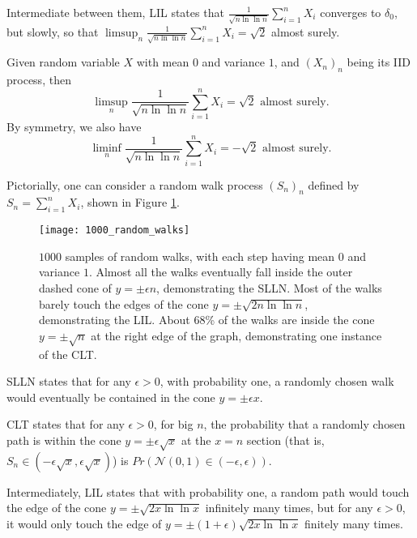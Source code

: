 Intermediate between them, LIL states that $\frac{1}{\sqrt{n\ln\ln{n}}} \sum_{i = 1}^n X_i$ converges to $\delta_0$, but slowly, so that $\limsup_n \frac{1}{\sqrt{n\ln\ln{n}}} \sum_{i = 1}^n X_i = \sqrt{2}$ almost surely.

\begin{theorem}
Given random variable $X$ with mean $0$ and variance $1$, and $(X_n)_n$ being its IID process, then
\begin{equation}
\limsup_n \frac{1}{\sqrt{n\ln\ln{n}}} \sum_{i = 1}^n X_i = \sqrt{2} \text{ almost surely.}
\end{equation}
By symmetry, we also have 
\begin{equation}
\liminf_n \frac{1}{\sqrt{n\ln\ln{n}}} \sum_{i = 1}^n X_i = -\sqrt{2} \text{ almost surely.}
\end{equation}
\end{theorem}

Pictorially, one can consider a random walk process $(S_n)_n$ defined by $S_n =  \sum_{i = 1}^n X_i$, shown in Figure \ref{fig:lil}.


\begin{figure}
	\texttt{[image: 1000\_random\_walks]}
	\caption{$1000$ samples of random walks, with each step having mean $0$ and variance $1$. Almost all the walks eventually fall inside the outer dashed cone of $y = \pm \epsilon n$, demonstrating the SLLN. Most of the walks barely touch the edges of the cone $y = \pm \sqrt{2 n \ln\ln{n}}$, demonstrating the LIL. About 68\% of the walks are inside the cone $y = \pm \sqrt{n }$ at the right edge of the graph, demonstrating one instance of the CLT.}
	\label{fig:lil}
\end{figure}

SLLN states that for any $\epsilon > 0$, with probability one, a randomly chosen walk would eventually be contained in the cone $y = \pm \epsilon x$.

CLT states that for any $\epsilon > 0$, for big $n$, the probability that a randomly chosen path is within the cone $y = \pm \epsilon \sqrt{x}$ at the $x = n$ section (that is, $S_n \in (-\epsilon \sqrt{x}, \epsilon \sqrt{x})$) is $Pr(\mathcal{N}(0, 1)\in (-\epsilon, \epsilon))$.

Intermediately, LIL states that with probability one, a random path would touch the edge of the cone $y = \pm \sqrt{2 x \ln\ln{x}}$ infinitely many times, but for any $\epsilon > 0$, it would only touch the edge of $y = \pm (1+\epsilon )\sqrt{2 x \ln\ln{x}}$ finitely many times.

